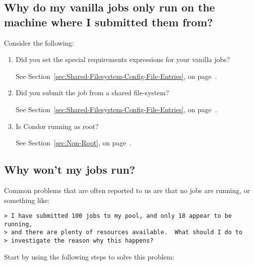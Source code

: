 \subsection{Why do my vanilla jobs only run on the machine where I submitted them from?}
Consider the following:
\begin {enumerate}
\item{Did you set the special requirements expressions for
your vanilla jobs?}

See Section~\ref{sec:Shared-Filesystem-Config-File-Entries}, on page~\pageref{sec:Shared-Filesystem-Config-File-Entries}.

\item{Did you submit the job from a shared file-system?}

See Section~\ref{sec:Shared-Filesystem-Config-File-Entries}, on page~\pageref{sec:Shared-Filesystem-Config-File-Entries}.

\item{Is Condor running as root?}

See Section~\ref{sec:Non-Root}, on page~\pageref{sec:Non-Root}.

\end{enumerate}

\subsection{Why won't my jobs run?}

Common problems that are often reported to us are that no jobs are running, or
something like:

\begin{verbatim}
> I have submitted 100 jobs to my pool, and only 18 appear to be running,
> and there are plenty of resources available.  What should I do to
> investigate the reason why this happens?
\end{verbatim}

Start by using the following steps to solve this problem:

